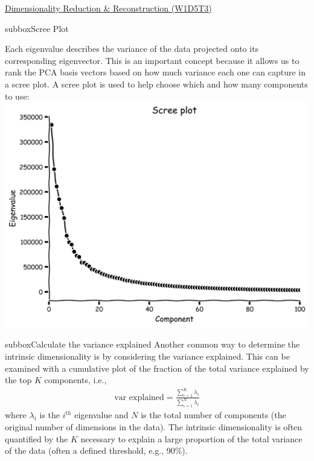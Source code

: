 \begin{textbox}{\href{https://compneuro.neuromatch.io/tutorials/W1D5_DimensionalityReduction/student/W1D5_Tutorial3.html}{Dimensionality Reduction \& Reconstruction (W1D5T3)} }
\begin{subbox}{subbox}{Scree Plot}
\scriptsize

Each eigenvalue describes the variance of the data projected onto its corresponding eigenvector. This is an important concept because it allows us to rank the PCA basis vectors based on how much variance each one can capture in a scree plot.
A scree plot is used to help choose which and how many components to use:
\centering
\includegraphics[scale=0.13]{Figures/DM/DMFigure3.png}

\end{subbox}

\begin{subbox}{subbox}{Calculate the variance explained
}
\scriptsize
Another common way to determine the intrinsic dimensionality is by considering the variance explained. This can be examined with a cumulative plot of the fraction of the total variance explained by the top $K$ components, i.e.,
\begin{align}
\text{var explained} = \frac{\sum_{i=1}^K \lambda_i}{\sum_{i=1}^N \lambda_i}
\end{align}
where $\lambda_i$ is the $i^{th}$ eigenvalue and $N$ is the total number of components (the original number of dimensions in the data).
The intrinsic dimensionality is often quantified by the $K$ necessary to explain a large proportion of the total variance of the data (often a defined threshold, e.g., 90\%).


\end{subbox}
\end{textbox}
